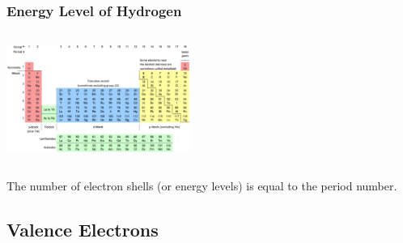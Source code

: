\documentclass{beamer}
\begin{document}
\begin{frame}


    \frametitle{Energy Level of Hydrogen}
    \begin{columns}
        
        \begin{column}{0.5\textwidth}
            \includegraphics[width=6cm]{../../../../public/images/pTable.png}
            
        \end{column}
        \begin{column}{0.5\textwidth}

            
        \end{column}
    \end{columns}

    \vspace{1cm}

    \onslide The number of electron 
    \pause \alert{shells}
    \onslide (or energy levels) is equal to the 
    \pause \alert{period}
    \onslide number.


\end{frame}



\subsection{Valence Electrons}
\end{document}
